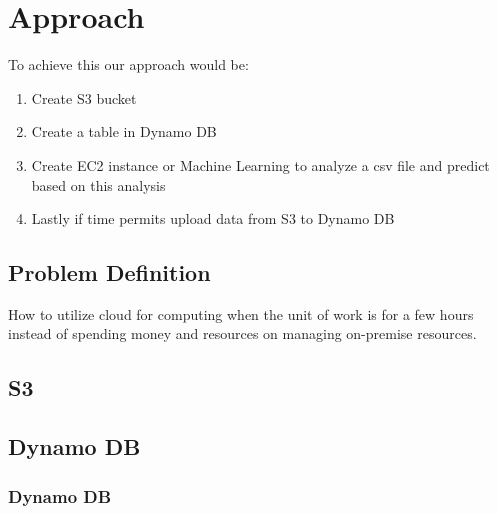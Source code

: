 \chapter{Approach}\label{chap:approach}

To achieve this our approach would be:

\begin{enumerate}
 \item Create S3 bucket
 \item Create a table in Dynamo DB
 \item Create EC2 instance or Machine Learning to analyze a csv file and predict based on this analysis
 \item Lastly if time permits upload data from S3 to Dynamo DB
 \end{enumerate} 

\section{Problem Definition}

How to utilize cloud for computing when the unit of work is for a few hours instead of spending money and resources on managing on-premise resources.

\section{S3}


\section{Dynamo DB}


\subsection*{Dynamo DB}
